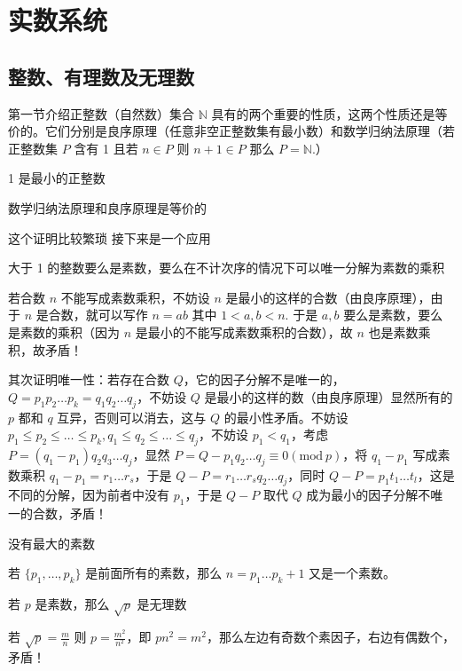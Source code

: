 \section{实数系统}

\subsection{整数、有理数及无理数}

第一节介绍正整数（自然数）集合 $\mathbb{N}$ 具有的两个重要的性质，这两个性质还是等价的。它们分别是良序原理（任意非空正整数集有最小数）和数学归纳法原理（若正整数集 $P$ 含有 1 且若 $n\in P$ 则 $n+1\in P$ 那么 $P=\mathbb{N}$.）

\begin{proposition}
1 是最小的正整数
\end{proposition}
\begin{proposition}
数学归纳法原理和良序原理是等价的
\end{proposition}
这个证明比较繁琐
接下来是一个应用

\begin{proposition}
大于 1 的整数要么是素数，要么在不计次序的情况下可以唯一分解为素数的乘积
\end{proposition}
若合数 $n$ 不能写成素数乘积，不妨设 $n$ 是最小的这样的合数（由良序原理），由于 $n$ 是合数，就可以写作 $n=ab$ 其中 $1<a,b<n$. 于是 $a, b$ 要么是素数，要么是素数的乘积（因为 $n$ 是最小的不能写成素数乘积的合数），故 $n$ 也是素数乘积，故矛盾！

其次证明唯一性：若存在合数 $Q$，它的因子分解不是唯一的，$Q=p_1p_2\dots p_k=q_1q_2\dots q_j$，不妨设 $Q$ 是最小的这样的数（由良序原理）显然所有的 $p$ 都和 $q$ 互异，否则可以消去，这与 $Q$ 的最小性矛盾。不妨设 $p_1\leq p_2\leq\dots\leq p_k,q_1\leq q_2\leq\dots\leq q_j$，不妨设 $p_1<q_1$，考虑 $P=(q_1-p_1)q_2q_3\dots q_j$，显然 $P=Q-p_1q_2\dots q_j\equiv0(\mathrm{mod}\ p)$，将 $q_1-p_1$ 写成素数乘积 $q_1-p_1=r_1\dots r_{s}$，于是 $Q-P=r_1\dots r_{s}q_2\dots q_j$，同时 $Q-P=p_1t_1\dots t_{l}$，这是不同的分解，因为前者中没有 $p_1$，于是 $Q-P$ 取代 $Q$ 成为最小的因子分解不唯一的合数，矛盾！

\begin{proposition}
没有最大的素数
\end{proposition}
若 $\{ p_1,\dots,p_k \}$ 是前面所有的素数，那么 $n=p_1\dots p_k+1$ 又是一个素数。

\begin{proposition}
若 $p$ 是素数，那么 $\sqrt{ p }$ 是无理数
\end{proposition}
若 $\sqrt{ p }=\frac{m}{n}$ 则 $p=\frac{m^{2}}{n^{2}}$，即 $pn^{2}=m^{2}$，那么左边有奇数个素因子，右边有偶数个，矛盾！

